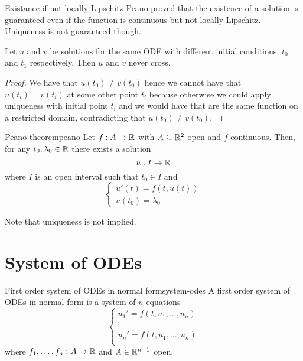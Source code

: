 \documentclass[12pt]{extarticle}
\begin{document}
\begin{remark}{Existance if not locally Lipschitz}{}
    Peano proved that the existence of a solution is guaranteed even if the function is continuous but not locally Lipschitz.
    Uniqueness is not guaranteed though.
\end{remark}

\begin{corollary}{}{}
    Let $u$ and $v$ be solutions for the same ODE with different initial conditions, $t_0$ and $t_1$ respectively.
    Then $u$ and $v$ never cross.
\end{corollary}

\begin{proof}
    We have that $u(t_0) \neq v(t_0)$ hence we cannot have that $u(t_i) = v(t_i)$ at some other point $t_i$ because otherwise we could apply uniqueness with initial point $t_i$ and we would have that are the same function on a restricted domain,
    contradicting that $u(t_0) \neq v(t_0)$.
\end{proof}

\begin{theorem}{Peano theorem}{peano}
    Let $f: A \to \mathbb{R}$ with $A \subseteq \mathbb{R}^2$ open and $f$ continuous.
    Then, for any $t_0, \lambda_0 \in \mathbb{R}$ there exists a solution
    \begin{equation}
        u: I \to \mathbb{R}
    \end{equation}
    where $I$ is an open interval such that $t_0 \in I$ and
    \begin{equation}
        \begin{cases}
            u'(t) = f(t, u(t)) \\
            u(t_0) = \lambda_0
        \end{cases}
    \end{equation}

    Note that uniqueness is not implied.
\end{theorem}

\section{System of ODEs}

\begin{definition}{First order system of ODEs in normal form}{system-odes}
    A first order system of ODEs in normal form is a system of $n$ equations
    \begin{equation}
        \begin{cases}
            u_1' = f(t, u_1, \dots, u_n) \\
            \vdots                       \\
            u_n' = f(t, u_1, \dots, u_n) \\
        \end{cases}
    \end{equation}
    where $f_1, \dots, f_n: A \to \mathbb{R}$ and $A \in \mathbb{R}^{n+1}$ open.
\end{definition}
\end{document}
